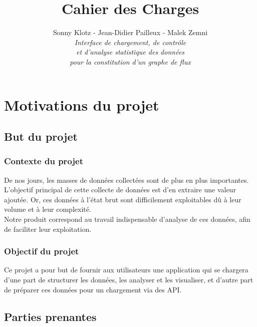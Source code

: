 

\title{\vspace{\fill}\textbf{\Huge Cahier des Charges}}
\author{Sonny Klotz - Jean-Didier Pailleux - Malek Zemni\vspace{2em}\\\textit{Interface de chargement, de contrôle}\\\textit{et d’analyse statistique des données}\\\textit{pour la constitution d’un graphe de flux}\vspace{2em}}



\clearpage
\maketitle\vspace{\fill}
\newpage
\tableofcontents
\newpage\clearpage{}

	\section{Motivations du projet}
		\subsection{But du projet}
			\subsubsection{Contexte du projet}
			De nos jours, les masses de données collectées sont de plus en plus importantes. L'objectif principal de cette collecte de données est d'en extraire une valeur ajoutée. Or, ces données à l'état brut sont difficilement exploitables dû à leur volume et à leur complexité.\\
			Notre produit correspond au travail indispensable d'analyse de ces données, afin de faciliter leur exploitation.
			\subsubsection{Objectif du projet}
			Ce projet a pour but de fournir aux utilisateurs une application qui se chargera d'une part de structurer les données, les analyser et les visualiser, et d'autre part de préparer ces données pour un chargement via des API.
		
		
		\subsection{Parties prenantes}
